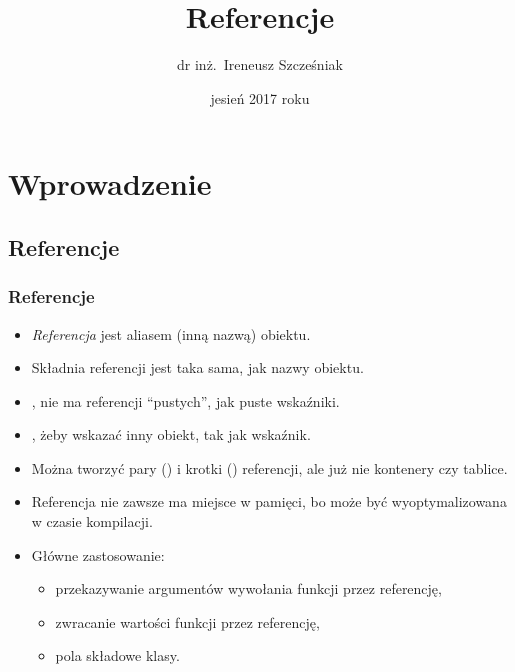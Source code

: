 \documentclass[compress]{beamer}
\begin{document}

\title{Referencje}

\author{dr inż.~Ireneusz Szcześniak}

\date{jesień 2017 roku}

\begin{frame}[plain]
  \titlepage
\end{frame}


\section{Wprowadzenie}

\subsection{Referencje}

\begin{frame}

  \frametitle{Referencje}

  \begin{itemize}
  \item \emph{Referencja} jest aliasem (inną nazwą) obiektu.
  \item Składnia referencji jest taka sama, jak nazwy obiektu.
  \item {}, nie ma referencji
    ``pustych'', jak puste wskaźniki.
  \item {}, żeby wskazać inny obiekt,
    tak jak wskaźnik.
  \item Można tworzyć pary () i krotki
    () referencji, ale już nie kontenery czy tablice.
  \item Referencja nie zawsze ma miejsce w pamięci, bo może być
    wyoptymalizowana w czasie kompilacji.
  \item Główne zastosowanie:
    \begin{itemize}
    \item przekazywanie argumentów wywołania funkcji przez referencję,
    \item zwracanie wartości funkcji przez referencję,
    \item pola składowe klasy.
    \end{itemize}
  \end{itemize}

\end{frame}
\end{document}
